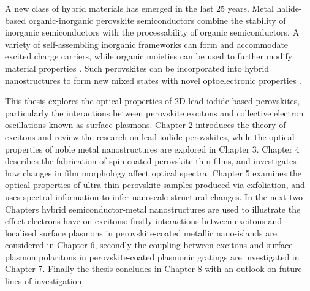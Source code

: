 A new class of hybrid materials has emerged in the last 25 years. Metal halide-based organic-inorganic perovskite semiconductors combine the stability of inorganic semiconductors with the processability of organic semiconductors. A variety of self-assembling inorganic frameworks can form and accommodate excited charge carriers, while organic moieties can be used to further modify material properties \cite{Cheng2010, Ishihara1990, Mitzi2001, Mitzi2001c, Nagami1996, Pradeesh2010, Pradeesh2009a, Lee2012, Heo2013, Liu2013, Hao2014}. Such perovskites can be incorporated into hybrid nanostructures to form new mixed states with novel optoelectronic properties \cite{Fujita1998, Fujita1999, Fujita2000, Ishi-Hayase2003, Brehier2006, Lanty2008, Pradeesh2009b, Sumioka2001}.

This thesis explores the optical properties of 2D lead iodide-based perovskites, particularly the interactions between perovskite excitons and collective electron oscillations known as surface plasmons. Chapter 2 introduces the theory of excitons and review the research on lead iodide perovskites, while the optical properties of noble metal nanostructures are explored in Chapter 3. Chapter 4 describes the fabrication of spin coated perovskite thin films, and investigates how changes in film morphology affect optical spectra. Chapter 5 examines the optical properties of ultra-thin perovskite samples produced via exfoliation, and uses spectral information to infer nanoscale structural changes. In the next two Chapters hybrid semiconductor-metal nanostructures are used to illustrate the effect electrons have on excitons: firstly interactions between excitons and localised surface plasmons in perovskite-coated metallic nano-islands are considered in Chapter 6, secondly the coupling between excitons and surface plasmon polaritons in perovskite-coated plasmonic gratings are investigated in Chapter 7. Finally the thesis concludes in Chapter 8 with an outlook on future lines of investigation.